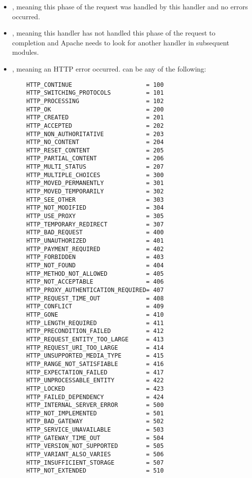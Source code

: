 \begin{itemize}

\item
  , meaning this phase of the request was handled by this 
  handler and no errors occurred. 

\item
  , meaning this handler has not handled this
  phase of the request to completion and Apache needs to look for
  another handler in subsequent modules.
  
\item
  , meaning an HTTP error occurred. 
   can be any of the following:

  \begin{verbatim}
    HTTP_CONTINUE                     = 100
    HTTP_SWITCHING_PROTOCOLS          = 101
    HTTP_PROCESSING                   = 102
    HTTP_OK                           = 200
    HTTP_CREATED                      = 201
    HTTP_ACCEPTED                     = 202
    HTTP_NON_AUTHORITATIVE            = 203
    HTTP_NO_CONTENT                   = 204
    HTTP_RESET_CONTENT                = 205
    HTTP_PARTIAL_CONTENT              = 206
    HTTP_MULTI_STATUS                 = 207
    HTTP_MULTIPLE_CHOICES             = 300
    HTTP_MOVED_PERMANENTLY            = 301
    HTTP_MOVED_TEMPORARILY            = 302
    HTTP_SEE_OTHER                    = 303
    HTTP_NOT_MODIFIED                 = 304
    HTTP_USE_PROXY                    = 305
    HTTP_TEMPORARY_REDIRECT           = 307
    HTTP_BAD_REQUEST                  = 400
    HTTP_UNAUTHORIZED                 = 401
    HTTP_PAYMENT_REQUIRED             = 402
    HTTP_FORBIDDEN                    = 403
    HTTP_NOT_FOUND                    = 404
    HTTP_METHOD_NOT_ALLOWED           = 405
    HTTP_NOT_ACCEPTABLE               = 406
    HTTP_PROXY_AUTHENTICATION_REQUIRED= 407
    HTTP_REQUEST_TIME_OUT             = 408
    HTTP_CONFLICT                     = 409
    HTTP_GONE                         = 410
    HTTP_LENGTH_REQUIRED              = 411
    HTTP_PRECONDITION_FAILED          = 412
    HTTP_REQUEST_ENTITY_TOO_LARGE     = 413
    HTTP_REQUEST_URI_TOO_LARGE        = 414
    HTTP_UNSUPPORTED_MEDIA_TYPE       = 415
    HTTP_RANGE_NOT_SATISFIABLE        = 416
    HTTP_EXPECTATION_FAILED           = 417
    HTTP_UNPROCESSABLE_ENTITY         = 422
    HTTP_LOCKED                       = 423
    HTTP_FAILED_DEPENDENCY            = 424
    HTTP_INTERNAL_SERVER_ERROR        = 500
    HTTP_NOT_IMPLEMENTED              = 501
    HTTP_BAD_GATEWAY                  = 502
    HTTP_SERVICE_UNAVAILABLE          = 503
    HTTP_GATEWAY_TIME_OUT             = 504
    HTTP_VERSION_NOT_SUPPORTED        = 505
    HTTP_VARIANT_ALSO_VARIES          = 506
    HTTP_INSUFFICIENT_STORAGE         = 507
    HTTP_NOT_EXTENDED                 = 510
  \end{verbatim}                      

\end{itemize}

